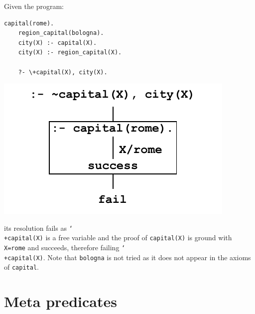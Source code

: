 \begin{description}
\begin{description}
                \begin{example} 
                    Given the program: \\
                    \begin{minipage}{0.45\textwidth}
                        \begin{lstlisting}[language={}, mathescape=true]
    capital(rome).
    region_capital(bologna).
    city(X) :- capital(X).
    city(X) :- region_capital(X).

    ?- \+capital(X), city(X).
                        \end{lstlisting}
                    \end{minipage}
                    \begin{minipage}{0.5\textwidth}
                        \includegraphics[width=0.7\linewidth]{img/_sldnf_incorrect_example.pdf}
                    \end{minipage}

                    its resolution fails as \texttt{\char`\\+capital(X)} is a free variable and 
                    the proof of \texttt{capital(X)} is ground with \texttt{X=rome} and succeeds, therefore failing \texttt{\char`\\+capital(X)}.
                    Note that \texttt{bologna} is not tried as it does not appear in the axioms of \texttt{capital}.
                \end{example}
        \end{description}
\end{description}



\section{Meta predicates}

